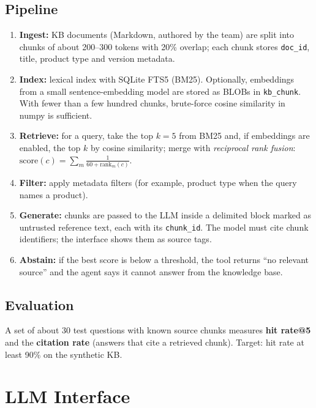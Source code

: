 \documentclass[10pt,a4paper]{article}
\newcommand{\code}[1]{\texttt{\small #1}}
\begin{document}
\subsection{Pipeline}
\begin{enumerate}
  \item \textbf{Ingest:} KB documents (Markdown, authored by the team) are split into chunks of about 200--300 tokens with 20\% overlap; each chunk stores \code{doc\_id}, title, product type and version metadata.
  \item \textbf{Index:} lexical index with SQLite FTS5 (BM25). Optionally, embeddings from a small sentence-embedding model are stored as BLOBs in \code{kb\_chunk}. With fewer than a few hundred chunks, brute-force cosine similarity in numpy is sufficient.
  \item \textbf{Retrieve:} for a query, take the top $k=5$ from BM25 and, if embeddings are enabled, the top $k$ by cosine similarity; merge with \emph{reciprocal rank fusion}: $\text{score}(c)=\sum_{m}\frac{1}{60+\text{rank}_m(c)}$.
  \item \textbf{Filter:} apply metadata filters (for example, product type when the query names a product).
  \item \textbf{Generate:} chunks are passed to the LLM inside a delimited block marked as untrusted reference text, each with its \code{chunk\_id}. The model must cite chunk identifiers; the interface shows them as source tags.
  \item \textbf{Abstain:} if the best score is below a threshold, the tool returns ``no relevant source'' and the agent says it cannot answer from the knowledge base.
\end{enumerate}

\subsection{Evaluation}
A set of about 30 test questions with known source chunks measures \textbf{hit rate@5} and the \textbf{citation rate} (answers that cite a retrieved chunk). Target: hit rate at least 90\% on the synthetic KB.

\section{LLM Interface}
\label{sec:llm}
\end{document}
